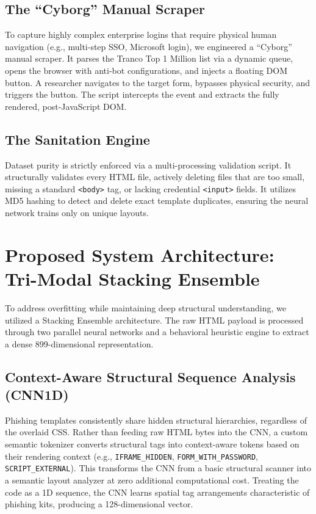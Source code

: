 \documentclass[conference]{IEEEtran}
\begin{document}
\subsection{The ``Cyborg'' Manual Scraper}
To capture highly complex enterprise logins that require physical human navigation (e.g., multi-step SSO, Microsoft login), we engineered a ``Cyborg'' manual scraper. It parses the Tranco Top 1 Million list via a dynamic queue, opens the browser with anti-bot configurations, and injects a floating DOM button. A researcher navigates to the target form, bypasses physical security, and triggers the button. The script intercepts the event and extracts the fully rendered, post-JavaScript DOM.

\subsection{The Sanitation Engine}
Dataset purity is strictly enforced via a multi-processing validation script. It structurally validates every HTML file, actively deleting files that are too small, missing a standard \texttt{<body>} tag, or lacking credential \texttt{<input>} fields. It utilizes MD5 hashing to detect and delete exact template duplicates, ensuring the neural network trains only on unique layouts.

\section{Proposed System Architecture: Tri-Modal Stacking Ensemble}
To address overfitting while maintaining deep structural understanding, we utilized a Stacking Ensemble architecture. The raw HTML payload is processed through two parallel neural networks and a behavioral heuristic engine to extract a dense 899-dimensional representation.

\subsection{Context-Aware Structural Sequence Analysis (CNN1D)}
Phishing templates consistently share hidden structural hierarchies, regardless of the overlaid CSS. Rather than feeding raw HTML bytes into the CNN, a custom semantic tokenizer converts structural tags into context-aware tokens based on their rendering context (e.g., \texttt{IFRAME\_HIDDEN}, \texttt{FORM\_WITH\_PASSWORD}, \texttt{SCRIPT\_EXTERNAL}). This transforms the CNN from a basic structural scanner into a semantic layout analyzer at zero additional computational cost. Treating the code as a 1D sequence, the CNN learns spatial tag arrangements characteristic of phishing kits, producing a 128-dimensional vector.
\end{document}
